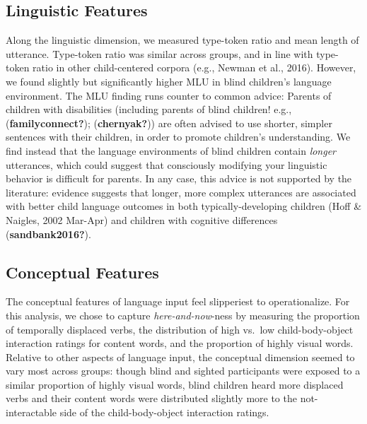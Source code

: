 \documentclass[
  man,floatsintext]{apa6}
\begin{document}
\hypertarget{linguistic-features-1}{%
\subsection{Linguistic Features}\label{linguistic-features-1}}

Along the linguistic dimension, we measured type-token ratio and mean length of utterance. Type-token ratio was similar across groups, and in line with type-token ratio in other child-centered corpora (e.g., Newman et al., 2016). However, we found slightly but significantly higher MLU in blind children's language environment. The MLU finding runs counter to common advice: Parents of children with disabilities (including parents of blind children! e.g., (\textbf{familyconnect?}); (\textbf{chernyak?})) are often advised to use shorter, simpler sentences with their children, in order to promote children's understanding. We find instead that the language environments of blind children contain \emph{longer} utterances, which could suggest that consciously modifying your linguistic behavior is difficult for parents. In any case, this advice is not supported by the literature: evidence suggests that longer, more complex utterances are associated with better child language outcomes in both typically-developing children (Hoff \& Naigles, 2002 Mar-Apr) and children with cognitive differences (\textbf{sandbank2016?}).

\hypertarget{conceptual-features-1}{%
\subsection{Conceptual Features}\label{conceptual-features-1}}

The conceptual features of language input feel slipperiest to operationalize. For this analysis, we chose to capture \emph{here-and-now}-ness by measuring the proportion of temporally displaced verbs, the distribution of high vs.~low child-body-object interaction ratings for content words, and the proportion of highly visual words. Relative to other aspects of language input, the conceptual dimension seemed to vary most across groups: though blind and sighted participants were exposed to a similar proportion of highly visual words, blind children heard more displaced verbs and their content words were distributed slightly more to the not-interactable side of the child-body-object interaction ratings.
\end{document}
